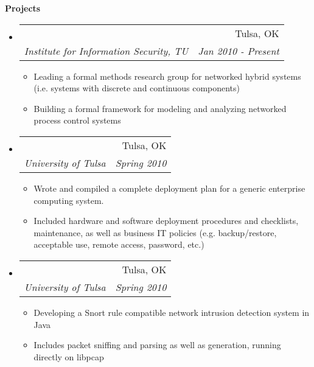 \documentclass[letterpaper,11pt]{article}
\makeatletter
\newcommand{\resitem}[1]{\item #1 \vspace{-2pt}}
\newcommand{\resheading}[1]{{\large \colorbox{mygrey}{\begin{minipage}{\textwidth}{\textbf{#1 \vphantom{p\^{E}}}}\end{minipage}}}}
\newcommand{\ressubheading}[4]{
\begin{tabular*}{6.5in}{l@{\extracolsep{\fill}}r}
		\textbf{\parbox{5in}{\raggedright #1 }} & #2 \\
		\textit{#3} & \textit{#4} \\
\end{tabular*}\vspace{-6pt}}
\makeatother
\begin{document}
\resheading{Projects}
\begin{itemize}
\item
	\ressubheading{Cyber-physical Systems}{Tulsa, OK}{Institute for Information Security, TU}{Jan 2010 - Present}
	\begin{itemize}
		\resitem{Leading a formal methods research group for networked hybrid systems (i.e. systems with discrete and continuous components)}
		\resitem{Building a formal framework for modeling and analyzing networked process control systems}
	\end{itemize}

\item
	\ressubheading{Deployment Plan}{Tulsa, OK}{University of Tulsa}{Spring 2010}
	\begin{itemize}
		\resitem{Wrote and compiled a complete deployment plan for a generic enterprise computing system.}
		\resitem{Included hardware and software deployment procedures and checklists, maintenance, as well as business IT policies (e.g. backup/restore, acceptable use, remote access, password, etc.)}
	\end{itemize}

\item
	\ressubheading{Intrusion Detection System}{Tulsa, OK}{University of Tulsa}{Spring 2010}
	\begin{itemize}
		\resitem{Developing a Snort rule compatible network intrusion detection system in Java}
		\resitem{Includes packet sniffing and parsing as well as generation, running directly on libpcap}
	\end{itemize}


\end{itemize}
\end{document}
